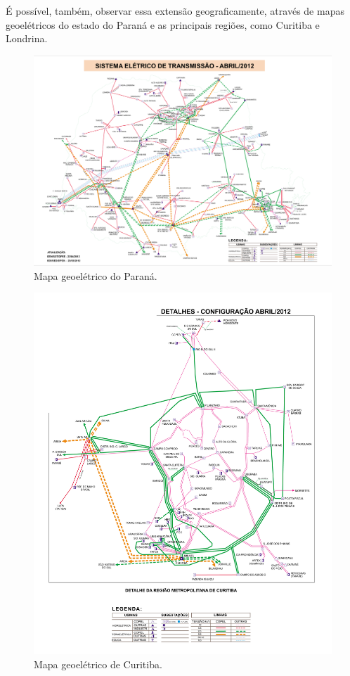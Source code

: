 \documentclass[grad,numbers]{coppe}
\begin{document}
  É possível, também, observar essa extensão geograficamente, através de mapas geoelétricos do estado do Paraná e as principais regiões, como Curitiba e Londrina.
  \begin{figure}[H]
  \includegraphics[width=1\linewidth]{img/mapa_geoeletrico_parana} \caption{Mapa geoelétrico do Paraná.}\label{fig:unnamed-chunk-5}
  \end{figure}
  \begin{figure}[H]
  \includegraphics[width=1\linewidth]{img/mapa_geoeletrico_curitiba} \caption{Mapa geoelétrico de Curitiba.}\label{fig:unnamed-chunk-6}
  \end{figure}
\end{document}

